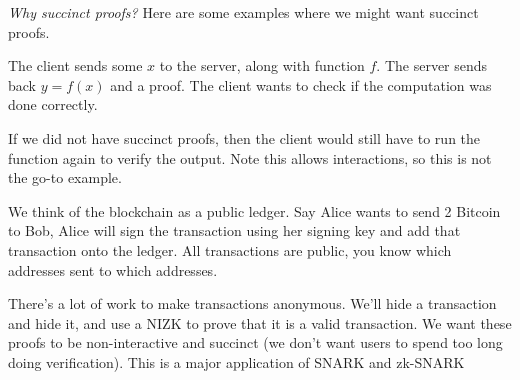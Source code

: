 \emph{Why succinct proofs?} Here are some examples where we might want succinct proofs.
\begin{example}
    The client sends some $x$ to the server, along with function $f$. The server sends back $y = f(x)$ and a proof. The client wants to check if the computation was done correctly.


    If we did not have succinct proofs, then the client would still have to run the function again to verify the output. Note this allows interactions, so this is not the go-to example.
\end{example}
\begin{example}
    We think of the blockchain as a public ledger. Say Alice wants to send 2 Bitcoin to Bob, Alice will sign the transaction using her signing key and add that transaction onto the ledger. All transactions are public, you know which addresses sent to which addresses.


    There's a lot of work to make transactions anonymous. We'll hide a transaction and hide it, and use a NIZK to prove that it is a valid transaction. We want these proofs to be non-interactive and succinct (we don't want users to spend too long doing verification). This is a major application of SNARK and zk-SNARK
\end{example}

